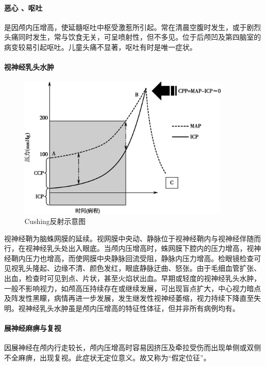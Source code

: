 \paragraph{恶心 、呕吐}

是因颅内压增高，使延髓呕吐中枢受激惹所引起。常在清晨空腹时发生，或于剧烈头痛同时发生，常与饮食无关，可呈喷射性，但不多见。位于后颅凹及第四脑室的病变较易引起呕吐。儿童头痛不显著，呕吐有时是唯一症状。

\paragraph{视神经乳头水肿}

\begin{figure}[!htbp]
 \centering
 \includegraphics[width=4.01042in,height=2.70833in]{./images/Image00153.jpg}
 \captionsetup{justification=centering}
 \caption{Cushing反射示意图}
 \label{fig41-1}
  \end{figure} 

视神经鞘为脑蛛网膜的延续。视网膜中央动、静脉位于视神经鞘内与视神经伴随而行，在视神经乳头处出入眼底。当颅内压增高时，蛛网膜下腔内的压力增高，视神经鞘内压力也增高，而使网膜中央静脉回流受阻，静脉内压力增高。检眼镜检查可见视乳头隆起、边缘不清、颜色发红，眼底静脉迂曲、怒张。由于毛细血管扩张、出血，检查时可见到点、片状，甚至火焰状出血。早期或轻度的视神经乳头水肿，一般不影响视力，如颅高压持续存在或继续发展，可出现盲点扩大，中心视力暗点及阵发性黑矇，病情再进一步发展，发生继发性视神经萎缩，视力持续下降直至失明。视神经乳头水肿虽是颅内压增高的特征性体征，但并非所有病例均有。

\paragraph{展神经麻痹与复视}

因展神经在颅内行走较长，颅内压增高时容易因挤压及牵拉受伤而出现单侧或双侧不全麻痹，出现复视。此症状无定位意义。故又称为“假定位征”。

